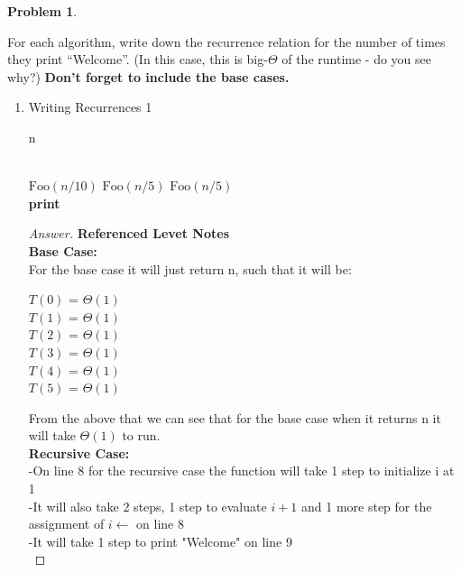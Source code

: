 \documentclass[11pt]{article}
\theoremstyle{definition}
\theoremstyle{definition}
\newtheorem{required}{Problem}
\theoremstyle{definition}
\begin{document}
\setcounter{required}{15}
\begin{required} \label{wdr}

For each algorithm, write down the recurrence relation for the number of times they print ``Welcome''. (In this case, this is big-$\Theta$ of the runtime - do you see why?) \textbf{Don't forget to include the base cases.}

\begin{enumerate}[label=(\alph*)]
\subsection{Problem 16\ref{wdr1}}
\item \label{wdr1}

\begin{algorithm}
\caption{Writing Recurrences 1}\label{alg:Recurrence1}
\begin{algorithmic}[1]
\Return n
\EndIf

\noindent \\
\State $\text{Foo}(n/10)$
\State $\text{Foo}(n/5)$
\State $\text{Foo}(n/5)$ \\
    
    \State \textbf{print} 
\EndFor
\EndProcedure
\end{algorithmic}
\end{algorithm}

\begin{proof}[Answer] \textbf{Referenced Levet Notes} \\
\textbf{Base Case:} \\
For the base case it will just return n, such that it will be: \\
\begin{center}
$T(0)$ = $\Theta(1)$ \\
$T(1)$ = $\Theta(1)$ \\ 
$T(2)$ = $\Theta(1)$ \\
$T(3)$ = $\Theta(1)$ \\
$T(4)$ = $\Theta(1)$ \\ 
$T(5)$ = $\Theta(1)$ \\
\end{center}
From the above that we can see that for the base case when it returns n it will take $\Theta(1)$  to run. \\

\textbf{Recursive Case:} \\
\indent-On line 8 for the recursive case the function will take 1 step to initialize i at 1 \\
\indent-It will also take 2 steps, 1 step  to evaluate $i + 1$ and 1 more step for the assignment of $i \gets$ on line 8 \\
\indent-It will take 1 step to print "Welcome" on line 9 \\


\end{proof}
\end{enumerate}
\end{required}
\end{document}

